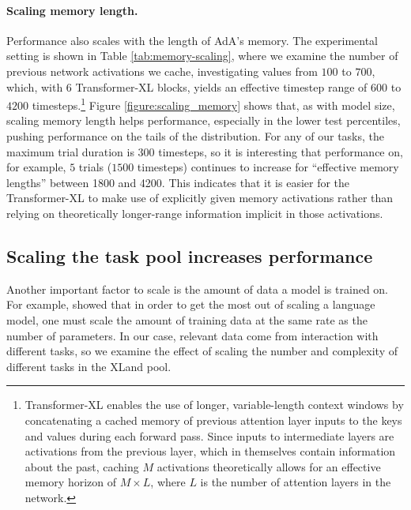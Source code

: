 \documentclass[11pt, a4paper, logo, copyright]{deepmind}
\begin{document}
\paragraph{Scaling memory length.}
Performance also scales with the length of AdA's memory. The experimental setting is shown in Table \ref{tab:memory-scaling}, where we examine the number of previous network activations we cache, investigating values from $100$ to $700$, which, with $6$ Transformer-XL blocks, yields an effective timestep range of $600$ to $4200$ timesteps.\footnote{Transformer-XL enables the use of longer, variable-length context windows by concatenating a cached memory of previous attention layer inputs to the keys and values during each forward pass. Since inputs to intermediate layers are activations from the previous layer, which in themselves contain information about the past, caching $M$ activations theoretically allows for an effective memory horizon of $M \times L$, where $L$ is the number of attention layers in the network. }
Figure \ref{figure:scaling_memory} shows that, as with model size, scaling memory length helps performance, especially in the lower test percentiles, pushing performance on the tails of the distribution. For any of our tasks, the maximum trial duration is 300 timesteps, so it is interesting that performance on, for example, $5$ trials ($1500$ timesteps) continues to increase for ``effective memory lengths'' between 1800 and 4200. This indicates that it is easier for the Transformer-XL to make use of explicitly given memory activations rather than relying on theoretically longer-range information implicit in those activations.
\subsection{Scaling the task pool increases performance} \label{sec:results_task_scaling}
Another important factor to scale is the amount of data a model is trained on. For example, \citet{hoffmann2022training} showed that in order to get the most out of scaling a language model, one must scale the amount of training data at the same rate as the number of parameters. In our case, relevant data come from interaction with different tasks, so we examine the effect of scaling the number and complexity of different tasks in the XLand pool.
\end{document}
